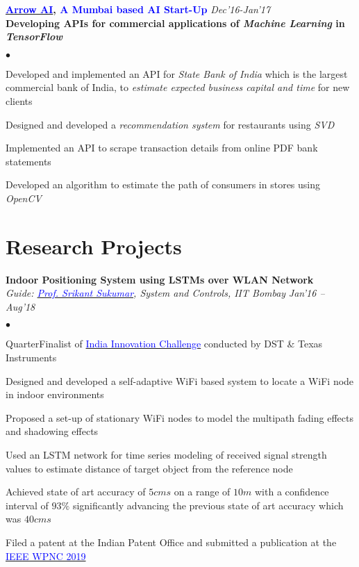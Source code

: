 \documentclass[margin,line]{res}
\newenvironment{list2}{
  \begin{list}{$\bullet$}{%
      \setlength{\itemsep}{0.03in}
      \setlength{\parsep}{0in} \setlength{\parskip}{0in}
      \setlength{\topsep}{0in} \setlength{\partopsep}{0in} 
      \setlength{\leftmargin}{0.2in}}}{\end{list}}
\begin{document}
\begin{resume}
{\bf \href{http://arrowai.com}{\textcolor{blue} {Arrow AI}}, {\textcolor{blue}{A Mumbai based AI Start-Up}}}  \hfill {\it Dec'16-Jan'17} \\
\textbf{Developing APIs for commercial applications of \emph{Machine Learning} in \emph{TensorFlow}}\\
\vspace*{-.1in}
\begin{list2}
\item Developed and implemented an API for \emph{State Bank of India} which is the largest commercial bank of India, to \emph{estimate expected business capital and time} for new clients
\item Designed and developed a \emph{recommendation system} for restaurants using \emph{SVD}
\item Implemented an API to scrape transaction details from online PDF bank statements
\item Developed an algorithm to estimate the path of consumers in stores using \emph{OpenCV} 
\end{list2}

\section{\sc Research Projects}


{\bf Indoor Positioning System using LSTMs over WLAN Network} \\
{\em Guide: \href{http://www.sc.iitb.ac.in/~srikant/dokuwiki/doku.php}{\textcolor{blue}{Prof. Srikant Sukumar}}, System and Controls, IIT Bombay} \hfill{\it Jan'16 -- Aug'18} \\
\vspace*{-.13in}
\begin{list2}
\item QuarterFinalist of \href{https://innovate.mygov.in/india-innovation-challenge-design-contest-2018/}{\textcolor{blue} {India Innovation Challenge}} conducted by DST \& Texas Instruments
\item Designed and developed a self-adaptive WiFi based system to locate a WiFi node in indoor environments
\item Proposed a set-up of stationary WiFi nodes to model the multipath fading effects and shadowing effects
\item Used an LSTM network for time series modeling of received signal strength values to estimate distance
of target object from the reference node
\item Achieved state of art accuracy of $5 cms$ on a range of $10 m$ with a confidence interval of $93\%$ significantly advancing the previous state of art accuracy which was $40 cms$ \\ 
\item Filed a patent at the Indian Patent Office and submitted a publication at the  \href{https://wpnc.info}{\textcolor{blue}{IEEE WPNC 2019}}
\end{list2}


\end{resume}
\end{document}
